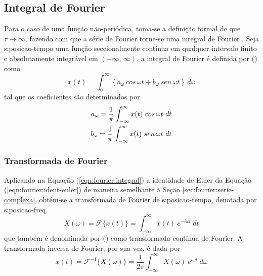 \documentclass[12pt,openright,oneside,a4paper,
	chapter=TITLE,section=TITLE,
	english,brazil]{abntex2}
\begin{document}
	\subsection{Integral de Fourier}
	Para o caso de uma função não-periódica, toma-se a definição formal de que $ \tau\to\infty $, fazendo com que a série de Fourier torne-se uma integral de Fourier \cite{spiegel:1977}. Seja \gls{s:posicao-tempo} uma função seccionalmente contínua em qualquer intervalo finito e absolutamente integrável em $ (-\infty ,\,\infty) $, a integral de Fourier é definida por  (\citeyear{spiegel:1977}) como
	\begin{equation}\label{eqn:fourier:integral}
		x(t) = \int_{0}^{\infty}\left\lbrace a_\omega\:cos\,\omega t + b_\omega\:sen\,\omega t\right\rbrace\, d\omega
	\end{equation}
	tal que os coeficientes  são determinados por
	\begin{align}
		a_\omega = \frac{1}{\pi}\int_{-\infty}^{\infty}x(t)\ cos\,\omega t\ dt \notag\\
		b_\omega = \frac{1}{\pi}\int_{-\infty}^{\infty}x(t)\ sen\,\omega t\ dt
	\end{align}
	
	\subsubsection{Transformada de Fourier} \label{sec:fourier:transform}
	Aplicando na Equação (\ref{eqn:fourier:integral}) a identidade de Euler da Equação (\ref{eqn:fourier:ident-euler}) de maneira semelhante à Seção \ref{sec:fourier:serie-complexa}, obtém-se a transformada de Fourier \cite{savi:2017} de \gls{s:posicao-tempo}, denotada por \gls{s:posicao-freq}
	\begin{equation} \label{eqn:fourier:transform}
		X(\omega) = \mathcal{F}\{x(t)\} = \int_{-\infty}^{\infty}x(t)\ e^{-i\omega t}\:dt
	\end{equation}
	que também é denominada por  (\citeyear{dimarogonas:1995}) como transformada contínua de Fourier. A transformada inversa de Fourier, por sua vez, é dada por \cite{spiegel:1977}
	\begin{equation}
		x(t) = \mathcal{F}^{-1}\{X(\omega)\} = \frac{1}{2\pi}\int_{-\infty}^{\infty}X(\omega)\ e^{i\omega t}\:d\omega
	\end{equation}
	
\end{document}
